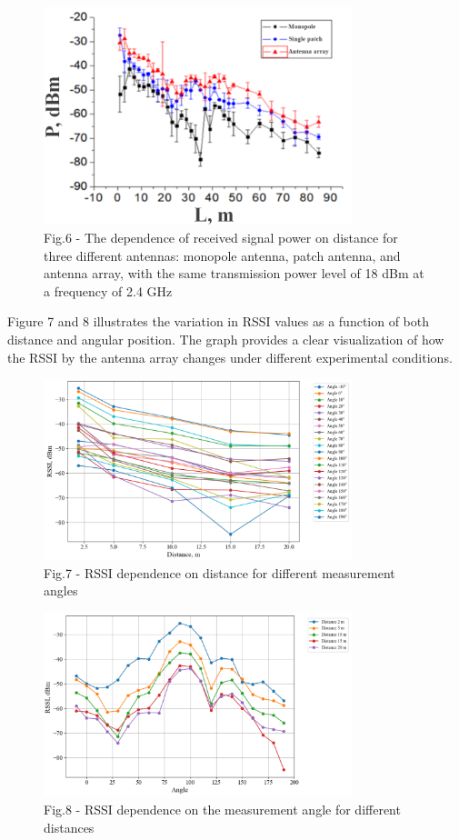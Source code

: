 \begin{figure}[H]
	\centering
	\includegraphics[width=0.8\textwidth]{media/ict/image46}
	\caption*{Fig.6 - The dependence of received signal power on distance for
three different antennas: monopole antenna, patch antenna, and antenna
array, with the same transmission power level of 18 dBm at a frequency
of 2.4 GHz}
\end{figure}

Figure 7 and 8 illustrates the variation in RSSI values as a function of
both distance and angular position. The graph provides a clear
visualization of how the RSSI by the antenna array changes under
different experimental conditions.

\begin{figure}[H]
	\centering
	\includegraphics[width=0.8\textwidth]{media/ict/image47}
	\caption*{Fig.7 - RSSI dependence on distance for different measurement angles}
\end{figure}

\begin{figure}[H]
	\centering
	\includegraphics[width=0.8\textwidth]{media/ict/image48}
	\caption*{Fig.8 - RSSI dependence on the measurement angle for different distances}
\end{figure}

